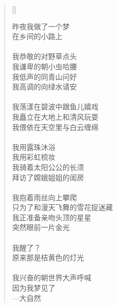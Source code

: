 \renewcommand{\poemtoc}{section}
\settowidth{\versewidth}{昨夜我做了一个梦}
\begin{verse}[\versewidth]

昨夜我做了一个梦\\
在乡间的小路上\\
~\\
我恭敬的对野草点头\\
我谦卑的朝小虫哈腰\\
我低声的同青山问好\\
我高调的向绿水请安\\
~\\
我荡漾在碧波中跟鱼儿嬉戏\\
我矗立在大地上和清风玩耍\\
我偎依在天空里与白云缠绵\\
~\\
我用露珠沐浴\\
我用彩虹梳妆\\
我骑着太阳公公的长须\\
拜访了嫦娥姐姐的闺房\\
~\\
我抱着雨丝向上攀爬\\
只为了和漫天飞舞的雪花捉迷藏\\
我正准备亲吻头顶的星星\\
突然眼前一片金光\\
~\\
我醒了？\\
原来那是桔黄色的灯光\\
~\\
我兴奋的朝世界大声呼喊\\
因为我梦见了\\
\vin\vin---大自然
\end{verse}
